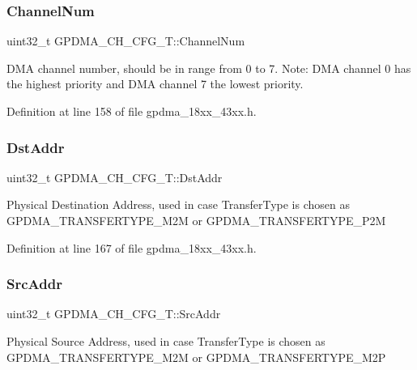 \subsubsection{\texorpdfstring{Channel\+Num}{ChannelNum}}
{\footnotesize\ttfamily uint32\+\_\+t G\+P\+D\+M\+A\+\_\+\+C\+H\+\_\+\+C\+F\+G\+\_\+\+T\+::\+Channel\+Num}

D\+MA channel number, should be in range from 0 to 7. Note\+: D\+MA channel 0 has the highest priority and D\+MA channel 7 the lowest priority. 

Definition at line 158 of file gpdma\+\_\+18xx\+\_\+43xx.\+h.

\mbox{\label{struct_g_p_d_m_a___c_h___c_f_g___t_a6e67f866c02d9a27662c798bac0554b8}} 
\subsubsection{\texorpdfstring{Dst\+Addr}{DstAddr}}
{\footnotesize\ttfamily uint32\+\_\+t G\+P\+D\+M\+A\+\_\+\+C\+H\+\_\+\+C\+F\+G\+\_\+\+T\+::\+Dst\+Addr}

Physical Destination Address, used in case Transfer\+Type is chosen as G\+P\+D\+M\+A\+\_\+\+T\+R\+A\+N\+S\+F\+E\+R\+T\+Y\+P\+E\+\_\+\+M2M or G\+P\+D\+M\+A\+\_\+\+T\+R\+A\+N\+S\+F\+E\+R\+T\+Y\+P\+E\+\_\+\+P2M 

Definition at line 167 of file gpdma\+\_\+18xx\+\_\+43xx.\+h.

\mbox{\label{struct_g_p_d_m_a___c_h___c_f_g___t_a53adde93dea1ba4ce81af0fd4bd3e66e}} 
\subsubsection{\texorpdfstring{Src\+Addr}{SrcAddr}}
{\footnotesize\ttfamily uint32\+\_\+t G\+P\+D\+M\+A\+\_\+\+C\+H\+\_\+\+C\+F\+G\+\_\+\+T\+::\+Src\+Addr}

Physical Source Address, used in case Transfer\+Type is chosen as G\+P\+D\+M\+A\+\_\+\+T\+R\+A\+N\+S\+F\+E\+R\+T\+Y\+P\+E\+\_\+\+M2M or G\+P\+D\+M\+A\+\_\+\+T\+R\+A\+N\+S\+F\+E\+R\+T\+Y\+P\+E\+\_\+\+M2P 

